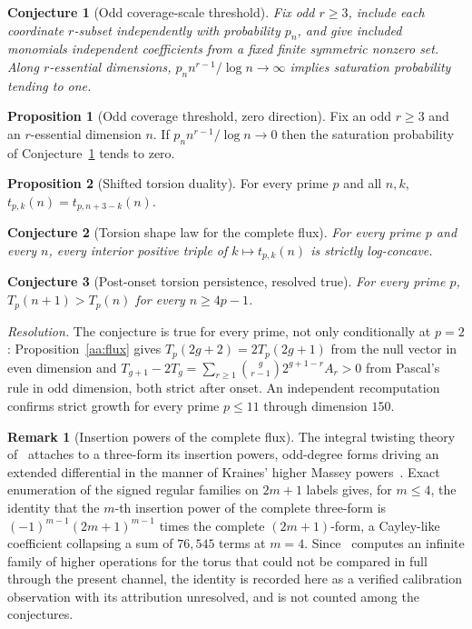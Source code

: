 \documentclass[11pt]{article}
\newtheorem{conjecture}{Conjecture}
\theoremstyle{definition}
\newtheorem{proposition}{Proposition}
\newtheorem{remarkx}{Remark}
\begin{document}
\begin{conjecture}[Odd coverage-scale threshold]\label{ad2}
Fix odd $r\ge3$, include each coordinate $r$-subset independently with probability $p_n$, and give included monomials independent coefficients from a fixed finite symmetric nonzero set.  Along $r$-essential dimensions, $p_nn^{r-1}/\log n\to\infty$ implies saturation probability tending to one.
\end{conjecture}

\begin{proposition}[Odd coverage threshold, zero direction]\label{ad:cover}
Fix an odd $r\ge3$ and an $r$-essential dimension $n$.  If $p_nn^{r-1}/\log n\to0$ then the saturation probability of Conjecture~\ref{ad2} tends to zero.
\end{proposition}

\begin{proposition}[Shifted torsion duality]\label{ad:dual}
For every prime $p$ and all $n,k$, $t_{p,k}(n)=t_{p,n+3-k}(n)$.
\end{proposition}

\begin{conjecture}[Torsion shape law for the complete flux]\label{ad3}
For every prime $p$ and every $n$, every interior positive triple of $k\mapsto t_{p,k}(n)$ is strictly log-concave.
\end{conjecture}

\begin{conjecture}[Post-onset torsion persistence, resolved true]\label{ad4}
For every prime $p$, $T_p(n+1)>T_p(n)$ for every $n\ge4p-1$.
\end{conjecture}

\emph{Resolution.} The conjecture is true for every prime, not only conditionally at $p=2$: Proposition~\ref{aa:flux} gives $T_p(2g+2)=2T_p(2g+1)$ from the null vector in even dimension and $T_{g+1}-2T_g=\sum_{r\ge1}\binom g{r-1}2^{g+1-r}A_r>0$ from Pascal's rule in odd dimension, both strict after onset.  An independent recomputation confirms strict growth for every prime $p\le11$ through dimension $150$.

\begin{remarkx}[Insertion powers of the complete flux]\label{ad:kraines}
The integral twisting theory of~\cite{LME24} attaches to a three-form its insertion powers, odd-degree forms driving an extended differential in the manner of Kraines' higher Massey powers~\cite{Kra66}.  Exact enumeration of the signed regular families on $2m+1$ labels gives, for $m\le4$, the identity that the $m$-th insertion power of the complete three-form is $(-1)^{m-1}(2m+1)^{m-1}$ times the complete $(2m+1)$-form, a Cayley-like coefficient collapsing a sum of $76{,}545$ terms at $m=4$.  Since~\cite{LME24} computes an infinite family of higher operations for the torus that could not be compared in full through the present channel, the identity is recorded here as a verified calibration observation with its attribution unresolved, and is not counted among the conjectures.
\end{remarkx}
\end{document}
